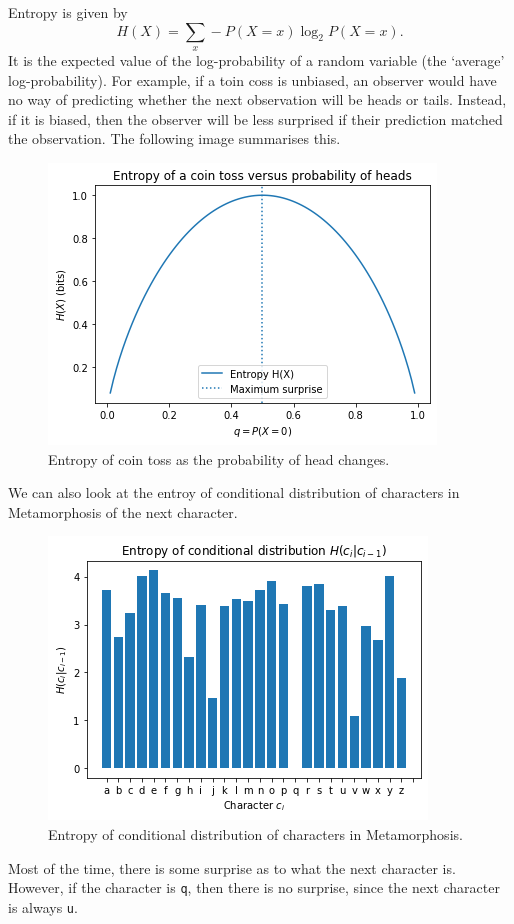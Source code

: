 \documentclass[a4paper, openany]{memoir}
\begin{document}
Entropy is given by
\[H(X) = \sum_x -P(X = x) \log_2 P(X = x).\]
It is the expected value of the log-probability of a random variable (the `average' log-probability). For example, if a toin coss is unbiased, an observer would have no way of predicting whether the next observation will be heads or tails. Instead, if it is biased, then the observer will be less surprised if their prediction matched the observation. The following image summarises this.
\begin{figure}[H]
    \centering
    \includegraphics[scale=0.55]{src/5.10 entropy of coin toss.png}
    \caption{Entropy of coin toss as the probability of head changes.}
\end{figure}
\noindent We can also look at the entroy of conditional distribution of characters in Metamorphosis of the next character.
\begin{figure}[H]
    \centering
    \includegraphics[scale=0.55]{src/5.11 entroy of conditional distribution.png}
    \caption{Entropy of conditional distribution of characters in Metamorphosis.}
\end{figure}
\noindent Most of the time, there is some surprise as to what the next character is. However, if the character is \texttt{q}, then there is no surprise, since the next character is always \texttt{u}.
\end{document}
